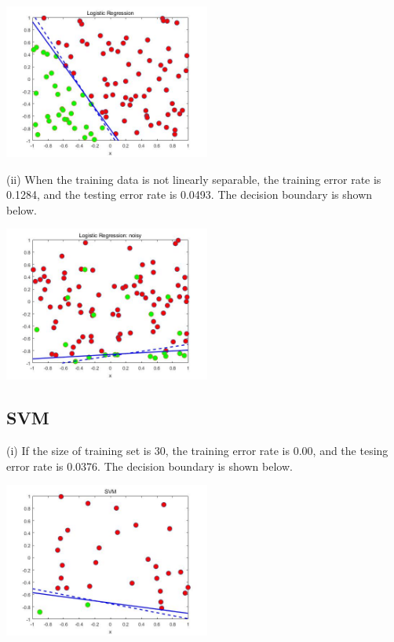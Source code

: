 \documentclass[11pt]{article} %
\begin{document}
\begin{center}
\includegraphics[height=2in]{./Logistic_i.jpg}
\end{center}

(ii) When the training data is not linearly separable, the training error rate is 0.1284, and the testing error rate is 0.0493. The decision boundary is shown below.

\begin{center}
\includegraphics[height=2in]{./Logistic_ii.jpg}
\end{center}


\subsection{SVM}

(i) If the size of training set is 30, the training error rate is 0.00, and the tesing error rate is 0.0376. The decision boundary is shown below.

\begin{center}
\includegraphics[height=2in]{./SVM_i.jpg}
\end{center}
\end{document}
